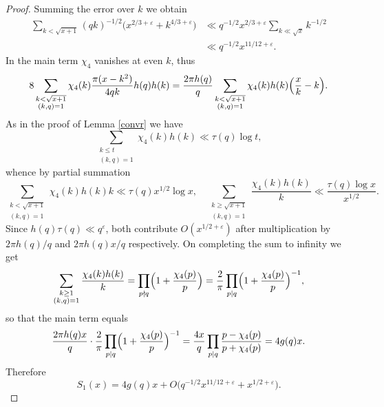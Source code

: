 \documentclass[12pt]{amsart}
\theoremstyle{remark}
\begin{document}
\begin{proof}
    Summing the error over $k$ we obtain
    \[
        \begin{split}
            \sum_{k < \sqrt{x+1}}(qk)^{-1/2}\bigl(x^{2/3+\varepsilon}+k^{4/3+\varepsilon}\bigr)
            &\ll q^{-1/2}x^{2/3+\varepsilon}\sum_{k \ll \sqrt{x}} k^{-1/2} \\
            &\ll q^{-1/2} x^{11/12+\varepsilon}.
        \end{split}
    \]
    In the main term $\chi_4$ vanishes at even $k$, thus
    \[
        8\sum_{\substack{k<\sqrt{x+1}\\ (k,q)=1}}\chi_4(k)\frac{\pi(x-k^2)}{4qk}h(q)h(k)
        = \frac{2\pi h(q)}{q}\sum_{\substack{k<\sqrt{x+1}\\ (k,q)=1}}
          \chi_4(k)h(k)\Bigl(\frac{x}{k}-k\Bigr).
    \]
    As in the proof of Lemma \ref{convr} we have
    \[
        \sum_{\substack{k \le t \\ (k,q)=1}} \chi_4(k)h(k) \ll \tau(q)\log t,
    \]
    whence by partial summation
    \[
        \sum_{\substack{k<\sqrt{x+1}\\ (k,q)=1}}\chi_4(k)h(k)k \ll \tau(q)x^{1/2}\log x,
        \quad
        \sum_{\substack{k \ge \sqrt{x+1}\\ (k,q)=1}}\frac{\chi_4(k)h(k)}{k}
        \ll \frac{\tau(q)\log x}{x^{1/2}}.
    \]
    Since $h(q)\tau(q) \ll q^{\varepsilon}$, both contribute $O(x^{1/2+\varepsilon})$
    after multiplication by $2\pi h(q)/q$ and $2\pi h(q)x/q$ respectively. On completing the sum to infinity we get
    \[
        \sum_{\substack{k \ge 1\\ (k,q)=1}}\frac{\chi_4(k)h(k)}{k}
        = \prod_{p \nmid q}\Bigl(1+\frac{\chi_4(p)}{p}\Bigr)
        = \frac{2}{\pi}\prod_{p \mid q}\Bigl(1+\frac{\chi_4(p)}{p}\Bigr)^{-1},
    \]
    so that the main term equals
    \[
        \frac{2\pi h(q)x}{q}\cdot\frac{2}{\pi}
        \prod_{p \mid q}\Bigl(1+\frac{\chi_4(p)}{p}\Bigr)^{-1}
        = \frac{4x}{q}\prod_{p \mid q}\frac{p-\chi_4(p)}{p+\chi_4(p)} = 4g(q)x.
    \]
    Therefore
    \[
        S_1(x) = 4g(q)x + O\bigl(q^{-1/2}x^{11/12+\varepsilon}+x^{1/2+\varepsilon}\bigr).
    \]
    

\end{proof}
\end{document}
